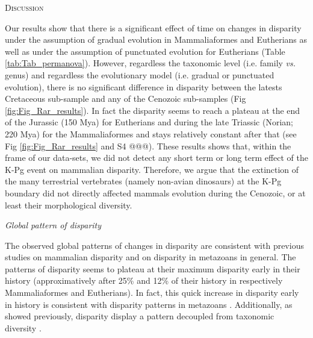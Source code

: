 \documentclass[12pt,letterpaper]{article}
\renewcommand{\section}[1]{%
\bigskip
\begin{center}
\begin{Large}
\normalfont\scshape #1
\medskip
\end{Large}
\end{center}}
\renewcommand{\subsection}[1]{%
\bigskip
\begin{center}
\begin{large}
\normalfont\itshape #1
\end{large}
\end{center}}
\begin{document}
\section{Discussion}
Our results show that there is a significant effect of time on changes in disparity under the assumption of gradual evolution in Mammaliaformes and Eutherians as well as under the assumption of punctuated evolution for Eutherians (Table \ref{tab:Tab_permanova}).
However, regardless the taxonomic level (i.e. family \textit{vs.} genus) and regardless the evolutionary model (i.e. gradual or punctuated evolution), there is no significant difference in disparity between the latests Cretaceous sub-sample and any of the Cenozoic sub-samples (Fig \ref{fig:Fig_Rar_results}).
In fact the disparity seems to reach a plateau at the end of the Jurassic (150 Mya) for Eutherians and during the late Triassic (Norian; 220 Mya) for the Mammaliaformes and stays relatively constant after that (see Fig \ref{fig:Fig_Rar_results} and S4 @@@).
These results shows that, within the frame of our data-sets, we did not detect any short term or long term effect of the K-Pg event on mammalian disparity.
Therefore, we argue that the extinction of the many terrestrial vertebrates (namely non-avian dinosaurs) at the K-Pg boundary did not directly affected mammals evolution during the Cenozoic, or at least their morphological diversity.

\subsection{Global pattern of disparity} %
The observed global patterns of changes in disparity are consistent with previous studies on mammalian disparity and on disparity in metazoans in general.
The patterns of disparity seems to plateau at their maximum disparity early in their history (approximatively after 25\% and 12\% of their history in respectively Mammaliaformes and Eutherians).
In fact, this quick increase in disparity early in history is consistent with disparity patterns in metazoans \citep{Hughes20082013}.
Additionally, as showed previously, disparity display a pattern decoupled from taxonomic diversity \citep{slaterCetacean,ruta2013,hopkinsdecoupling2013}.
\end{document}
